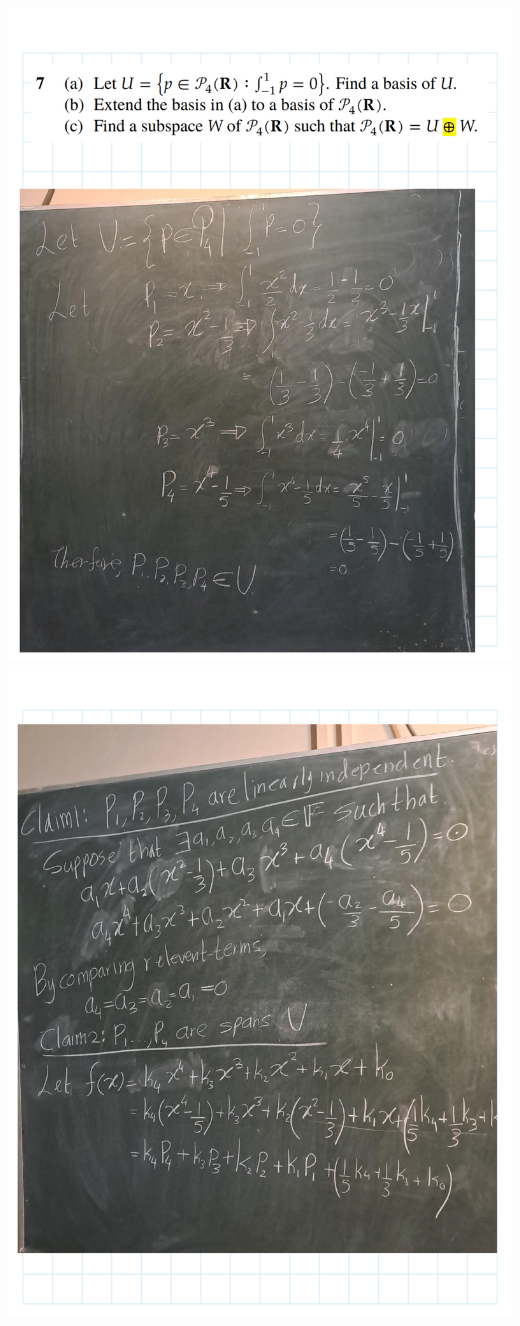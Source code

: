 \documentclass[
]{book}
\theoremstyle{definition}
\theoremstyle{definition}
\theoremstyle{definition}
\theoremstyle{definition}
\theoremstyle{remark}
\begin{document}
\includegraphics{fig/Ex 2B and 2C/Ex 2c (30).png}
\includegraphics{fig/Ex 2B and 2C/Ex 2c (31).png}
\end{document}

